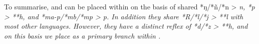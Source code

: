 To summarise,
 and  can be placed within  on
the basis of shared *ŋ/*ñ/*n > \it{n},
*p > **h, and *ma-p/*mb/*mp > \it{p}.
In addition they share *R/*l/*j > **l with most other  languages.
However, they have a distinct reflex of *d/*z > **h,
and on this basis we place  as a primary
branch within .
